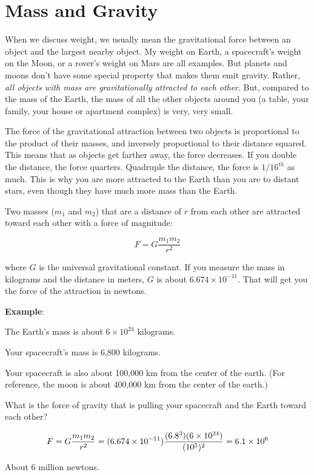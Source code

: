\section{Mass and Gravity}
When we discuss weight, we usually mean the gravitational force between an object and the largest nearby object. My weight on Earth, a spacecraft's weight on the Moon, or a rover's weight on Mars are all examples. But planets and moons don't have some special property that makes them emit gravity. Rather, \textit{all objects with mass are gravitationally attracted to each other}. But, compared to the mass of the Earth, the mass of all the other objects around you (a table, your family, your house or apartment complex) is very, very small. 

The
force of the gravitational attraction between two objects is proportional to the product
of their masses, and inversely proportional to their distance squared.
This means that as objects get farther away, the force decreases. If you double the distance, the force quarters. Quadruple the distance, the force is $1/16^{th}$ as much. 
This is why you are more attracted to the Earth than you are to
distant stars, even though they have much more mass than the Earth.

\begin{mdframed}[style=important, frametitle={Newton's Law of Universal Gravitation}]

Two masses ($m_1$ and $m_2$) that are a distance of
$r$ from each other are attracted toward each other with a force of
magnitude:

$$F = G\frac{m_1 m_2}{r^2}$$

where $G$ is the universal gravitational constant. If you measure the
mass in kilograms and the distance in meters, $G$ is about $6.674
\times 10^{-11}$. That will get you the force of the attraction in
newtons.

\end{mdframed}

\textbf{Example}: %

\begin{Exercise}[title={Gravity}, label=gravity_earth]

  The Earth's mass is about $6 \times 10^{24}$ kilograms.

  Your spacecraft's mass is 6,800 kilograms.

  Your spacecraft is also about 100,000 km from the center of the earth. (For 
  reference, the moon is about 400,000 km from the center of the earth.)

  What is the force of gravity that is pulling your spacecraft and the Earth 
  toward each other?

\end{Exercise}
\begin{Answer}[ref=gravity_earth]

  $$F = G\frac{m_1 m_2}{r^2} = (6.674 \times 10^{-11})\frac{(6.8 \time 10^3)(6 
  \times 10^{24})}{(10^5)^2} = 6.1 \times 10^{6}$$

  About 6 million newtons.

\end{Answer}

